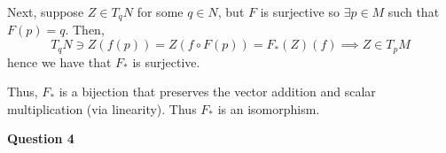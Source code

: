 \documentclass[10pt]{article}
\begin{document}
Next, suppose $Z\in T_{q}N$ for some $q\in N$, but $F$ is surjective so $\exists p \in M$ such that $F(p) = q$. Then,
$$T_{q}N \ni Z(f(p)) = Z(f\circ F(p)) = F_{*}(Z)(f) \implies Z \in T_{p}M$$
hence we have that $F_{*}$ is surjective.

Thus, $F_{*}$ is a bijection that preserves the vector addition and scalar multiplication (via linearity). Thus $F_{*}$ is an isomorphism.

\newpage

\textbf{Question 4}
\end{document}
